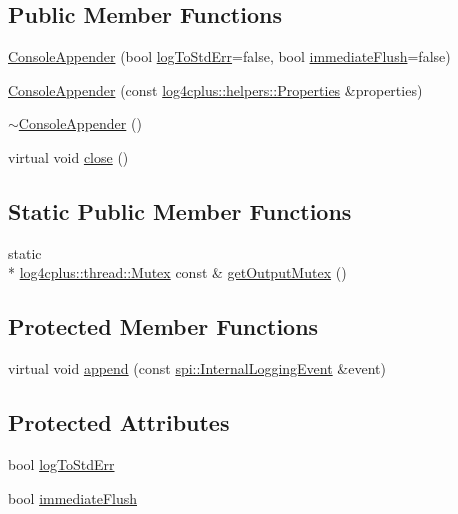 \subsection*{Public Member Functions}
\begin{DoxyCompactItemize}
\item 
\hyperlink{classlog4cplus_1_1ConsoleAppender_af98d47115c88bfbc45e9b80b5038f0ec}{Console\-Appender} (bool \hyperlink{classlog4cplus_1_1ConsoleAppender_ad014a66a6af1e1d33d3a311d65122d90}{log\-To\-Std\-Err}=false, bool \hyperlink{classlog4cplus_1_1ConsoleAppender_a19df4423821530ceeca467b8f827ec02}{immediate\-Flush}=false)
\item 
\hyperlink{classlog4cplus_1_1ConsoleAppender_af64dc9992e9b3487ddc962a28494e048}{Console\-Appender} (const \hyperlink{classlog4cplus_1_1helpers_1_1Properties}{log4cplus\-::helpers\-::\-Properties} \&properties)
\item 
\hyperlink{classlog4cplus_1_1ConsoleAppender_acce881eb7b2083c8af248dbfe857b0fb}{$\sim$\-Console\-Appender} ()
\item 
virtual void \hyperlink{classlog4cplus_1_1ConsoleAppender_aebb4ee6bb4fc08b361c39b16b425fde3}{close} ()
\end{DoxyCompactItemize}
\subsection*{Static Public Member Functions}
\begin{DoxyCompactItemize}
\item 
static \\*
\hyperlink{classlog4cplus_1_1thread_1_1Mutex}{log4cplus\-::thread\-::\-Mutex} const \& \hyperlink{classlog4cplus_1_1ConsoleAppender_a0547bbc1d5437a9e42ccf6cc6d767bfc}{get\-Output\-Mutex} ()
\end{DoxyCompactItemize}
\subsection*{Protected Member Functions}
\begin{DoxyCompactItemize}
\item 
virtual void \hyperlink{classlog4cplus_1_1ConsoleAppender_a52038f78971b73fdb5650e8e1e6b1872}{append} (const \hyperlink{classlog4cplus_1_1spi_1_1InternalLoggingEvent}{spi\-::\-Internal\-Logging\-Event} \&event)
\end{DoxyCompactItemize}
\subsection*{Protected Attributes}
\begin{DoxyCompactItemize}
\item 
bool \hyperlink{classlog4cplus_1_1ConsoleAppender_ad014a66a6af1e1d33d3a311d65122d90}{log\-To\-Std\-Err}
\item 
bool \hyperlink{classlog4cplus_1_1ConsoleAppender_a19df4423821530ceeca467b8f827ec02}{immediate\-Flush}
\end{DoxyCompactItemize}
